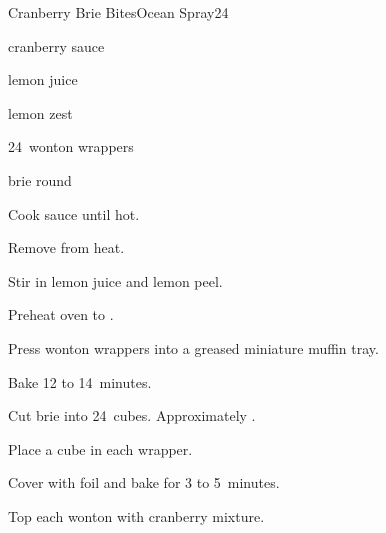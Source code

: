 \begin{recipe}{Cranberry Brie Bites}{Ocean Spray}{24}

\begin{ingredients}
\item \C{\threequarter} cranberry sauce
\item {} lemon juice
\item \tp{\half} lemon zest
\item 24~wonton wrappers
\item {} brie round
\end{ingredients}

\begin{directions}
\item Cook sauce until hot.
\item Remove from heat.
\item Stir in lemon juice and lemon peel.
\item Preheat oven to .
\item Press wonton wrappers into a greased miniature muffin tray.
\item Bake 12 to 14~minutes.
\item Cut brie into 24~cubes. Approximately \inch{\threequarter}.
\item Place a cube in each wrapper.
\item Cover with foil and bake for 3 to 5~minutes.
\item Top each wonton with  cranberry mixture.
\end{directions}

\end{recipe}
